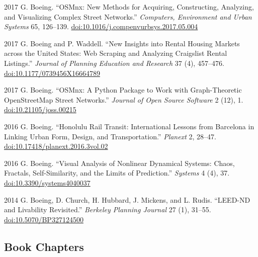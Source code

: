 \documentclass[11pt,letterpaper]{report}
\begin{document}
\begin{tablist}
        \item[2017] \tab{}G. Boeing. \enquote{OSMnx: New Methods for Acquiring, Constructing, Analyzing, and Visualizing Complex Street Networks.} \textit{Computers, Environment and Urban Systems} 65, 126--139. \href{https://doi.org/10.1016/j.compenvurbsys.2017.05.004}{doi:10.1016/j.compenvurbsys.2017.05.004}

        \item[2017] \tab{}G. Boeing and P. Waddell. \enquote{New Insights into Rental Housing Markets across the United States: Web Scraping and Analyzing Craigslist Rental Listings.} \textit{Journal of Planning Education and Research} 37 (4), 457--476. \href{https://doi.org/10.1177/0739456X16664789}{doi:10.1177/0739456X16664789}

        \item[2017] \tab{}G. Boeing. \enquote{OSMnx: A Python Package to Work with Graph-Theoretic OpenStreetMap Street Networks.} \textit{Journal of Open Source Software} 2 (12), 1. \href{https://doi.org/10.21105/joss.00215}{doi:10.21105/joss.00215}

        \item[2016] \tab{}G. Boeing. \enquote{Honolulu Rail Transit: International Lessons from Barcelona in Linking Urban Form, Design, and Transportation.} \textit{Planext} 2, 28--47. \href{https://doi.org/10.17418/planext.2016.3vol.02}{doi:10.17418/planext.2016.3vol.02}

        \item[2016] \tab{}G. Boeing. \enquote{Visual Analysis of Nonlinear Dynamical Systems: Chaos, Fractals, Self-Similarity, and the Limits of Prediction.} \textit{Systems} 4 (4), 37. \href{https://doi.org/10.3390/systems4040037}{doi:10.3390/systems4040037}

        \item[2014] \tab{}G. Boeing, D. Church, H. Hubbard, J. Mickens, and L. Rudis. \enquote{LEED-ND and Livability Revisited.} \textit{Berkeley Planning Journal} 27 (1), 31--55. \href{https://doi.org/10.5070/BP327124500}{doi:10.5070/BP327124500}

    \end{tablist}



    \subsection*{Book Chapters}
\end{document}
